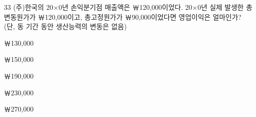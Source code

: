 \begin{question}{33}
(주)한국의 20×0년 손익분기점 매출액은 ￦120,000이었다. 20×0년 실제 발생한 총변동원가가 ￦120,000이고, 총고정원가가 ￦90,000이었다면 영업이익은 얼마인가? (단, 동 기간 동안 생산능력의 변동은 없음)
\begin{choices}
  \item ￦130,000
  \item ￦150,000
  \item ￦190,000
  \item ￦230,000
  \item ￦270,000
\end{choices}
\end{question}
